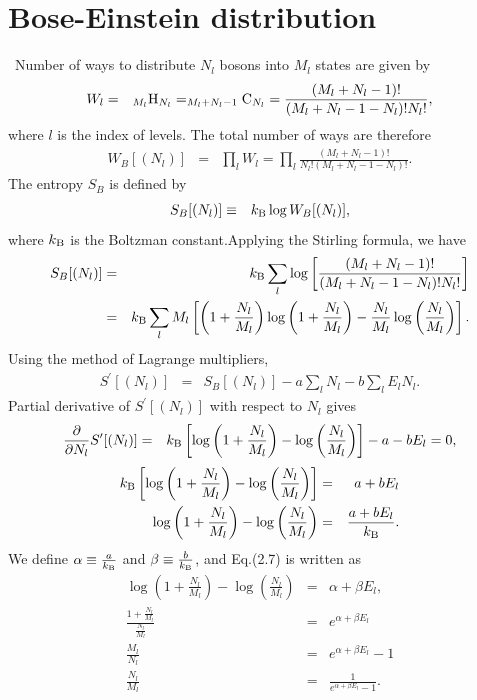 \documentclass[12pt,a4paper]{report} %
\newcommand{\kb} {k_{\rm B}}				%
\begin{document}
\section{Bose-Einstein distribution}
\ Number of ways to distribute $N_l$ bosons into $M_l$ states are given by
\begin{eqnarray}
W_l & = & _{M_l} {\rm H}_{N_l} = _{M_l + N_l - 1} {\rm C}_{N_l} =  \frac{(M_l+N_l-1)!}{(M_l+N_l-1-N_l)!N_l!}
,
\end{eqnarray}
where $l$ is the index of levels.
The total number of ways are therefore
\begin{eqnarray}
W_B[(N_l)] & = & \prod_l W_l = \prod_l \frac{(M_l+N_l-1)!}{N_l!(M_l+N_l-1-N_l)!}.
\end{eqnarray}
The entropy $S_B$ is defined by
\begin{eqnarray}
S_B[(N_l)] & \equiv & \kb \log W_B[(N_l)],
\end{eqnarray}
where $\kb$ is the Boltzman constant.Applying the Stirling formula, we have
\begin{eqnarray}
S_B[(N_l)] & = & \kb \sum_l \log
\left[
\frac{(M_l+N_l-1)!}{(M_l+N_l-1-N_l)!N_l!}
\right] \nonumber
\\
& = & \kb \sum_l M_l
\left[
\left(1 + \frac{N_l}{M_l}\right)
\log \left(1 + \frac{N_l}{M_l}\right)
- \frac{N_l}{M_l} \log \left( \frac{N_l}{M_l}\right)
\right].
\end{eqnarray}
Using the method of Lagrange multipliers,
\begin{eqnarray}
S^\prime [(N_l )] & = & S_B[( N_l )] - a \sum_l N_l - b \sum_l E_l N_l.
\end{eqnarray}
Partial derivative of $S^\prime [(N_l )]$ with respect to $N_l$ gives
\begin{eqnarray}
\frac{\partial}{\partial N_l}S^\prime [(N_l )] & = &
\kb
\left[
\log \left(1 + \frac{N_l}{M_l} \right) - \log \left( \frac{N_l}{M_l} \right)
\right] - a - b E_l = 0,
\end{eqnarray}
\begin{eqnarray}
\kb
\left[
\log \left(1 + \frac{N_l}{M_l} \right) - \log \left( \frac{N_l}{M_l} \right)
\right] & = & a + b E_l  \nonumber
\\
\log \left(1 + \frac{N_l}{M_l} \right) - \log \left( \frac{N_l}{M_l} \right)
& = & \frac{a + b E_l}{\kb}.
\end{eqnarray}
We define $\alpha \equiv \frac{a}{\kb}$ and $\beta \equiv \frac{b}{\kb}$, and Eq.(2.7) is written as
\begin{eqnarray}
\log \left(1 + \frac{N_l}{M_l} \right) - \log \left( \frac{N_l}{M_l} \right)
& = & \alpha + \beta E_l,
\\
\frac{1+\frac{N_l}{M_l}}{\frac{N_l}{M_l}} & = & e^{\alpha + \beta E_l} \nonumber
\\
\frac{M_l}{N_l} & = & e^{\alpha + \beta E_l} - 1 \nonumber
\\
\frac{N_l}{M_l} & = & \frac{1}{e^{\alpha + \beta E_l} -1}.
\end{eqnarray}
\end{document}
